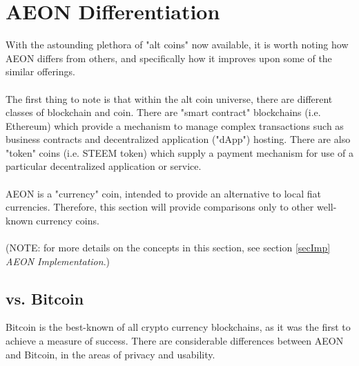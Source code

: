 \section{AEON Differentiation}

With the astounding plethora of "alt coins" now available, it is worth noting how AEON differs from others, and specifically how it improves upon some of the similar offerings.\\
\\
The first thing to note is that within the alt coin universe, there are different classes of blockchain and coin.  There are "smart contract" blockchains (i.e. Ethereum) which provide a mechanism to manage complex transactions such as business contracts and decentralized application ("dApp") hosting.  There are also "token" coins (i.e. STEEM token) which supply a payment mechanism for use of a particular decentralized application or service.\\
\\ 
AEON is a "currency" coin, intended to provide an alternative to local fiat currencies.  Therefore, this section will provide comparisons only to other well-known currency coins.\\
\\
(NOTE: for more details on the concepts in this section, see section \ref{secImp} \textit{AEON Implementation}.)

\subsection{vs. Bitcoin}
\label{secVsBitcoin}
Bitcoin is the best-known of all crypto currency blockchains, as it was the first to achieve a measure of success. There are considerable differences between AEON and Bitcoin, in the areas of privacy and usability.

